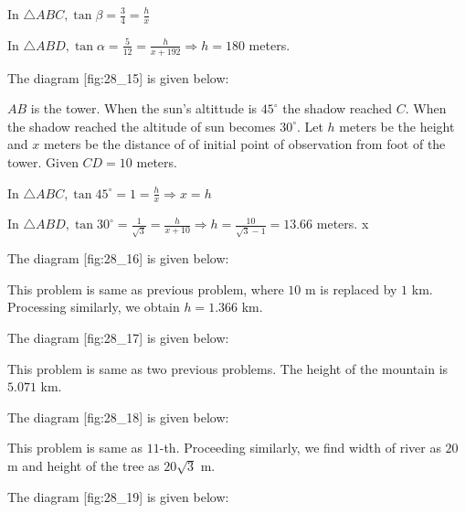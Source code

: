   In $\triangle ABC, \tan\beta = \frac{3}{4} = \frac{h}{x}$

  In $\triangle ABD, \tan\alpha = \frac{5}{12} = \frac{h}{x + 192} \Rightarrow h = 180$ meters.

\item The diagram [fig:28_15] is given below:

  \startplacefigure[reference=fig:28_15]
    \externalfigure[28_15.pdf]
  \stopplacefigure

  $AB$ is the tower. When the sun's altittude is $45^\circ$ the shadow reached $C$. When the shadow reached the
  altitude of sun becomes $30^\circ$. Let $h$ meters be the height and $x$ meters be the distance of of initial
  point of observation from foot of the tower. Given $CD = 10$ meters.

  In $\triangle ABC, \tan45^\circ = 1 = \frac{h}{x}\Rightarrow x = h$

  In $\triangle ABD, \tan30^\circ = \frac{1}{\sqrt{3}} = \frac{h}{x + 10}\Rightarrow h = \frac{10}{\sqrt{3} - 1} = 13.66$
  meters.
  x
\item The diagram [fig:28_16] is given below:

  \startplacefigure[reference=fig:28_16]
    \externalfigure[28_16.pdf]
  \stopplacefigure

  This problem is same as previous problem, where $10$ m is replaced by $1$ km. Processing similarly, we obtain
  $h = 1.366$ km.

\item The diagram [fig:28_17] is given below:

  \startplacefigure[reference=fig:28_17]
    \externalfigure[28_17.pdf]
  \stopplacefigure

  This problem is same as two previous problems. The height of the mountain is $5.071$ km.

\item The diagram [fig:28_18] is given below:

  \startplacefigure[reference=fig:28_18]
    \externalfigure[28_18.pdf]
  \stopplacefigure

  This problem is same as $11$-th. Proceeding similarly, we find width of river as $20$ m and height of the tree as
  $20\sqrt{3}$ m.

\item The diagram [fig:28_19] is given below:

  \startplacefigure[reference=fig:28_19]
    \externalfigure[28_19.pdf]
  \stopplacefigure


